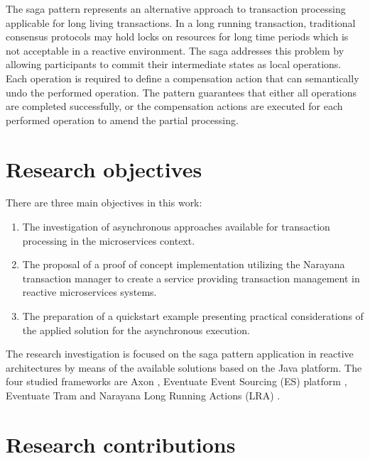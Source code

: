\documentclass[oneside,
  digital, %
  table,   %
  lof,     %
  lot,     %
]{fithesis3}
\begin{document}
The saga pattern \cite{sagas_publ} represents an alternative approach to transaction processing applicable for long living transactions. In a long running transaction, traditional consensus protocols may hold locks on resources for long time periods which is not acceptable in a reactive environment. The saga addresses this problem by allowing participants to commit their intermediate states as local operations. Each operation is required to define a compensation action that can semantically undo the performed operation. The pattern guarantees that either all operations are completed successfully, or the compensation actions are executed for each performed operation to amend the partial processing.

\section{Research objectives}

There are three main objectives in this work:

\begin{enumerate}
    \item The investigation of asynchronous approaches available for transaction processing in the microservices context.
    
    \item The proposal of a proof of concept implementation utilizing the Narayana transaction manager \cite{narayana} to create a service providing transaction management in reactive microservices systems.
    
    \item The preparation of a quickstart example presenting practical considerations of the applied solution for the asynchronous execution.
\end{enumerate}

The research investigation is focused on the saga pattern \cite{sagas_publ} application in reactive architectures by means of the available solutions based on the Java platform. The four studied frameworks are Axon \cite{axon_framework}, Eventuate Event Sourcing (ES) platform \cite{eventuate.io}, Eventuate Tram \cite{eventuate-tram} and Narayana Long Running Actions (LRA) \cite{narayana_lra}. 

\hfill \break


\section{Research contributions}
\end{document}
